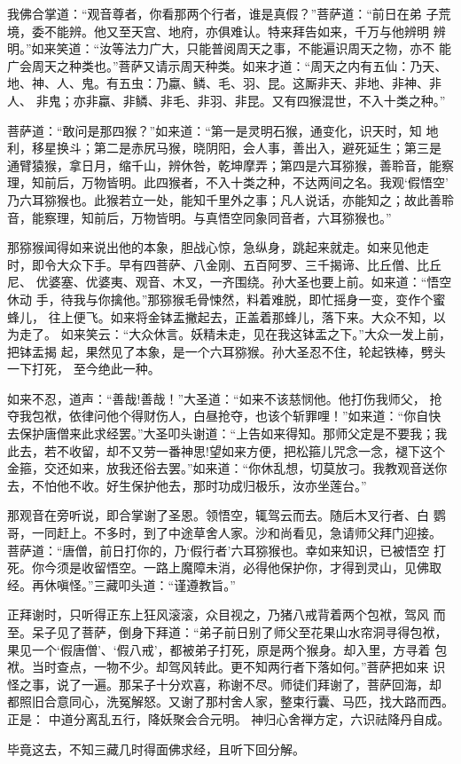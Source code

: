 我佛合掌道：“观音尊者，你看那两个行者，谁是真假？”菩萨道：“前日在弟
子荒境，委不能辨。他又至天宫、地府，亦俱难认。特来拜告如来，千万与他辨明
辨明。”如来笑道：“汝等法力广大，只能普阅周天之事，不能遍识周天之物，亦不
能广会周天之种类也。”菩萨又请示周天种类。如来才道：“周天之内有五仙：乃天、
地、神、人、鬼。有五虫：乃蠃、鳞、毛、羽、昆。这厮非天、非地、非神、非人、
非鬼；亦非蠃、非鳞、非毛、非羽、非昆。又有四猴混世，不入十类之种。”

菩萨道：“敢问是那四猴？”如来道：“第一是灵明石猴，通变化，识天时，知
地利，移星换斗；第二是赤尻马猴，晓阴阳，会人事，善出入，避死延生；第三是
通臂猿猴，拿日月，缩千山，辨休咎，乾坤摩弄；第四是六耳猕猴，善聆音，能察
理，知前后，万物皆明。此四猴者，不入十类之种，不达两间之名。我观‘假悟空’
乃六耳猕猴也。此猴若立一处，能知千里外之事；凡人说话，亦能知之；故此善聆
音，能察理，知前后，万物皆明。与真悟空同象同音者，六耳猕猴也。”

那猕猴闻得如来说出他的本象，胆战心惊，急纵身，跳起来就走。如来见他走
时，即令大众下手。早有四菩萨、八金刚、五百阿罗、三千揭谛、比丘僧、比丘尼、
优婆塞、优婆夷、观音、木叉，一齐围绕。孙大圣也要上前。如来道：“悟空休动
手，待我与你擒他。”那猕猴毛骨悚然，料着难脱，即忙摇身一变，变作个蜜蜂儿，
往上便飞。如来将金钵盂撇起去，正盖着那蜂儿，落下来。大众不知，以为走了。
如来笑云：“大众休言。妖精未走，见在我这钵盂之下。”大众一发上前，把钵盂揭
起，果然见了本象，是一个六耳猕猴。孙大圣忍不住，轮起铁棒，劈头一下打死，
至今绝此一种。

如来不忍，道声：“善哉!善哉！”大圣道：“如来不该慈悯他。他打伤我师父，
抢夺我包袱，依律问他个得财伤人，白昼抢夺，也该个斩罪哩！”如来道：“你自快
去保护唐僧来此求经罢。”大圣叩头谢道：“上告如来得知。那师父定是不要我；我
此去，若不收留，却不又劳一番神思!望如来方便，把松箍儿咒念一念，褪下这个
金箍，交还如来，放我还俗去罢。”如来道：“你休乱想，切莫放刁。我教观音送你
去，不怕他不收。好生保护他去，那时功成归极乐，汝亦坐莲台。”

那观音在旁听说，即合掌谢了圣恩。领悟空，辄驾云而去。随后木叉行者、白
鹦哥，一同赶上。不多时，到了中途草舍人家。沙和尚看见，急请师父拜门迎接。
菩萨道：“唐僧，前日打你的，乃‘假行者’六耳猕猴也。幸如来知识，已被悟空
打死。你今须是收留悟空。一路上魔障未消，必得他保护你，才得到灵山，见佛取
经。再休嗔怪。”三藏叩头道：“谨遵教旨。”

正拜谢时，只听得正东上狂风滚滚，众目视之，乃猪八戒背着两个包袱，驾风
而至。呆子见了菩萨，倒身下拜道：“弟子前日别了师父至花果山水帘洞寻得包袱，
果见一个‘假唐僧’、‘假八戒’，都被弟子打死，原是两个猴身。却入里，方寻着
包袱。当时查点，一物不少。却驾风转此。更不知两行者下落如何。”菩萨把如来
识怪之事，说了一遍。那呆子十分欢喜，称谢不尽。师徒们拜谢了，菩萨回海，却
都照旧合意同心，洗冤解怒。又谢了那村舍人家，整束行囊、马匹，找大路而西。
正是：
中道分离乱五行，降妖聚会合元明。
神归心舍禅方定，六识祛降丹自成。

毕竟这去，不知三藏几时得面佛求经，且听下回分解。